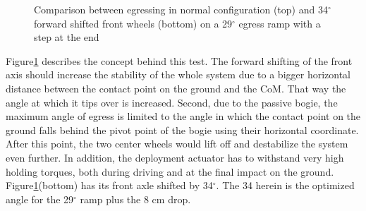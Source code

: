 \documentclass[a4paper,twocolumn]{esapub2005} %
\begin{document}
\begin{figure}[h]
    \centering
        \caption{Comparison between egressing in normal configuration (top) and
        34$^{\circ}$ forward shifted front wheels (bottom) on a 29$^{\circ}$
        egress ramp with a step at the end} \label{fig:egress29com}
\end{figure}

Figure\ref{fig:egress29com} describes the concept behind this test. The
forward shifting of the front axis should increase the stability of the
whole system due to a bigger horizontal distance between the contact point
on the ground and the CoM. That way the angle at which it tips over is
increased. Second, due to the passive bogie, the maximum angle of egress is
limited to the angle in which the contact point on the ground falls behind
the pivot point of the bogie using their horizontal coordinate. After this
point, the two center wheels would lift off and destabilize the system even
further. In addition, the deployment actuator has to withstand very high
holding torques, both during driving and at the final impact on the ground.
Figure\ref{fig:egress29com}(bottom) has its front axle shifted by
34$^\circ$. The 34 herein is the optimized angle for the 29$^\circ$ ramp
plus the 8 cm drop. 
\end{document}
